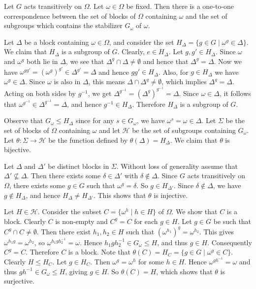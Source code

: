 \begin{proposition} \label{prop-block-and-stab}
	Let $G$ acts transitively on $\Omega$. Let $\omega\in \Omega$ be fixed. Then there is a one-to-one correspondence between the set of blocks of $\Omega$ containing $\omega$ and the set of subgroups which contains the stabilizer $G_\omega$ of $\omega$.
\end{proposition}
\begin{sketch}
	Let $\Delta$ be a block containing $\omega \in \Omega$, and consider the set $H_\Delta = \{g \in G \mid \omega^g \in \Delta\}$. We claim that $H_\Delta$ is a subgroup of  $G$. Clearly, $e \in H_\Delta$. Let $g,g' \in H_\Delta$. Since $\omega$ and $\omega^g$ both lie in $\Delta$, we see that $\Delta^g \cap \Delta\neq \emptyset$ and hence that $\Delta^g = \Delta$. Now we have $\omega^{gg'} = (\omega^g)^{g'} \in \Delta^{g'} = \Delta$ and hence $gg' \in H_\Delta$. Also, for $g \in H_\Delta$ we have $\omega^g \in \Delta$. Since $\omega$ is also in $\Delta$, this means $\Delta \cap \Delta^g \neq \emptyset$, which implies $\Delta^g = \Delta$. Acting on both sides by $g^{-1}$, we get $\Delta^{g^{-1}} = (\Delta^g)^{g^{-1}} = \Delta$. Since $\omega \in \Delta$, it follows that $\omega^{g^{-1}} \in \Delta^{g^{-1}} = \Delta$, and hence $g^{-1} \in H_\Delta$. Therefore $H_\Delta$ is a subgroup of $G$.
	
	Observe that $G_\omega \le H_\Delta$ since for any $s \in G_\omega$, we have $\omega^s=\omega \in \Delta$.  Let $\Sigma$ be the set of blocks of $\Omega$ containing $\omega$ and let $\mathcal{H}$ be the set of subgroups containing $G_\omega$. Let $\theta:\Sigma\rightarrow \mathcal{H}$ be the function defined by $\theta(\Delta)=H_\Delta$. We claim that $\theta$ is bijective.
	
	Let $\Delta$ and $\Delta'$ be distinct blocks in $\Sigma$. Without loss of generality assume that $\Delta'\not\subseteq \Delta$. Then there exists some  $\delta \in \Delta'$ with $\delta \notin \Delta$. Since $G$ acts transitively on $\Omega$, there exists some $g \in G$ such that $\omega^g = \delta$. So $g \in H_{\Delta'}$. Since $\delta\not\in \Delta$, we have $g \notin H_\Delta$, and hence $H_\Delta \ne H_{\Delta'}$. This shows that $\theta$ is injective.
	
	Let $H\in\mathcal{H}$. Consider the subset $C = \{\omega^h \mid h \in H\}$ of $\Omega$. We show that $C$ is a block. Clearly $C$ is non-empty and $C^g = C$ for each $g\in H$. Let $g \in G$ be such that $C^g \cap C\neq \emptyset$. Then there exist $h_1, h_2 \in H$ such that $(\omega^{h_1})^g = \omega^{h_2}$. This gives $\omega^{h_1g} = \omega^{h_2}$, so $\omega^{h_1gh_2^{-1}} = \omega$. Hence $h_1gh_2^{-1} \in G_\omega \le H$, and thus $g \in H$. Consequently $C^g = C$. Therefore $C$ is a block. Note that $\theta(C) = H_C = \{g \in G \mid \omega^g \in C\}$. Clearly $H \le H_C$. Let $g \in H_C$. Then $\omega^g = \omega^h$ for some $h \in H$. Hence $\omega^{gh^{-1}} = \omega$ and thus $gh^{-1} \in G_\omega \le H$, giving $g \in H$. So $\theta(C) = H$, which shows that $\theta$ is surjective.
\end{sketch}
